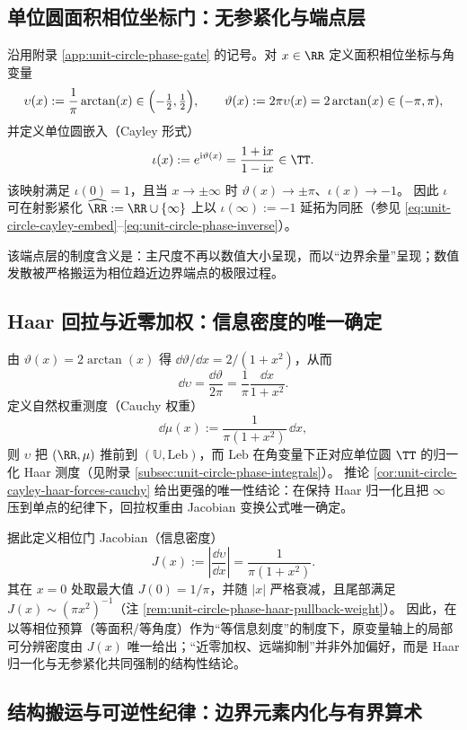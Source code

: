 \subsection{单位圆面积相位坐标门：无参紧化与端点层}\label{subsec:cdim-phase-gate-compactification}
沿用附录 \ref{app:unit-circle-phase-gate} 的记号。对 \(x\in\RR\) 定义面积相位坐标与角变量
\[
\upsilon(x):=\frac{1}{\pi}\arctan(x)\in\Bigl(-\tfrac12,\tfrac12\Bigr),
\qquad
\vartheta(x):=2\pi\upsilon(x)=2\arctan(x)\in(-\pi,\pi),
\]
并定义单位圆嵌入（Cayley 形式）
\[
\iota(x):=e^{\mathrm{i}\vartheta(x)}=\frac{1+\mathrm{i}x}{1-\mathrm{i}x}\in\TT.
\]
该映射满足 \(\iota(0)=1\)，且当 \(x\to\pm\infty\) 时 \(\vartheta(x)\to\pm\pi\)、\(\iota(x)\to-1\)。
因此 \(\iota\) 可在射影紧化 \(\widehat{\RR}:=\RR\cup\{\infty\}\) 上以 \(\iota(\infty):=-1\) 延拓为同胚（参见 \eqref{eq:unit-circle-cayley-embed}--\eqref{eq:unit-circle-phase-inverse}）。
\par
该端点层的制度含义是：主尺度不再以数值大小呈现，而以“边界余量”呈现；数值发散被严格搬运为相位趋近边界端点的极限过程。

\subsection{Haar 回拉与近零加权：信息密度的唯一确定}\label{subsec:cdim-haar-pullback}
由 \(\vartheta(x)=2\arctan(x)\) 得 \(\dd\vartheta/\dd x=2/(1+x^2)\)，从而
\[
\dd\upsilon=\frac{\dd\vartheta}{2\pi}=\frac{1}{\pi}\frac{\dd x}{1+x^2}.
\]
定义自然权重测度（Cauchy 权重）
\[
\dd\mu(x):=\frac{1}{\pi(1+x^2)}\,\dd x,
\]
则 \(\upsilon\) 把 \((\RR,\mu)\) 推前到 \((\mathbb{U},\mathrm{Leb})\)，而 \(\mathrm{Leb}\) 在角变量下正对应单位圆 \(\TT\) 的归一化 Haar 测度（见附录 \ref{subsec:unit-circle-phase-integrals}）。
推论 \ref{cor:unit-circle-cayley-haar-forces-cauchy} 给出更强的唯一性结论：在保持 Haar 归一化且把 \(\infty\) 压到单点的纪律下，回拉权重由 Jacobian 变换公式唯一确定。
\par
据此定义相位门 Jacobian（信息密度）
\[
J(x):=\left|\frac{\dd\upsilon}{\dd x}\right|=\frac{1}{\pi(1+x^2)}.
\]
其在 \(x=0\) 处取最大值 \(J(0)=1/\pi\)，并随 \(|x|\) 严格衰减，且尾部满足 \(J(x)\sim (\pi x^2)^{-1}\)（注 \ref{rem:unit-circle-phase-haar-pullback-weight}）。
因此，在以等相位预算（等面积/等角度）作为“等信息刻度”的制度下，原变量轴上的局部可分辨密度由 \(J(x)\) 唯一给出；“近零加权、远端抑制”并非外加偏好，而是 Haar 归一化与无参紧化共同强制的结构性结论。

\subsection{结构搬运与可逆性纪律：边界元素内化与有界算术}\label{subsec:cdim-transport-and-reversibility}
